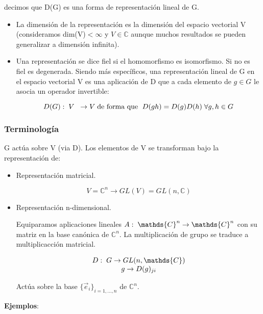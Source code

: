 decimos que D(G) es una forma de representación lineal de G.

\begin{itemize}
\item La dimensión de la representación es la dimensión del espacio vectorial V (consideramos dim(V)$<\infty$ y $V\in \mathds{C}$ aunque muchos resultados se pueden generalizar a dimensión infinita).
\item Una representación se dice fiel si el homomorfismo es isomorfismo. Si no es fiel es degenerada. Siendo más específicos, una representación lineal de G en el espacio vectorial V es una aplicación de D que a cada elemento de $g\in G$ le asocia un operador invertible:

$$D(G): \hspace{0.1cm} V \hspace{0.2cm} \to V \hspace{0.1cm}\text{de forma que } \hspace{0.1cm} D(gh)=D(g)D(h)\hspace{0.1cm} \forall g,h \in G$$
\end{itemize}

\subsubsection{Terminología}
G actúa sobre V (via D). Los elementos de V se transforman bajo la representación de:

\begin{itemize}
\item Representación matricial.

$$V=\mathds{C}^n\to GL(V)=GL(n, \mathds{C})$$
\item Representación n-dimensional.

Equiparamos aplicaciones lineales $A: \hspace{0.1cm} \mathds{C}^n \to  \mathds{C}^n$ con su matriz en la base canónica de $\mathds{C}^n$. La multiplicación de grupo se traduce a multiplicacción matricial.

$$\begin{array}{cc}
D: \hspace{0.1cm}G \to GL(n, \mathds{C}) \\
g\to D(g)_{ji}
\end{array}$$

Actúa sobre la base $\lbrace \Vec{e}_i\rbrace_{i=1,...,n}$ de $\mathds{C}^n$.
\end{itemize}

\textbf{Ejemplos}:


